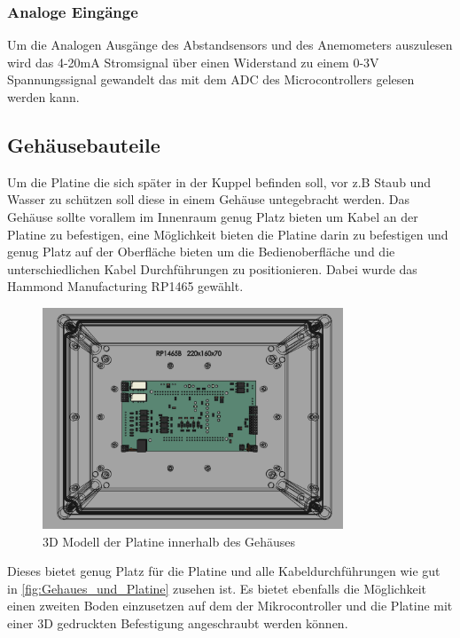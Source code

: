 \subsubsection{Analoge Eingänge}
Um die Analogen Ausgänge des Abstandsensors und des Anemometers auszulesen wird das 4-20mA Stromsignal über einen Widerstand zu einem 0-3V Spannungssignal gewandelt das mit dem \ac{ADC} des Microcontrollers gelesen werden kann.
\subsection{Gehäusebauteile}
Um die Platine die sich später in der Kuppel befinden soll, vor z.B Staub und Wasser zu schützen soll diese in einem Gehäuse untegebracht werden. Das Gehäuse sollte vorallem im Innenraum genug Platz bieten um Kabel an der Platine zu befestigen, eine Möglichkeit bieten die Platine darin zu befestigen und genug Platz auf der Oberfläche bieten um die Bedienoberfläche und die unterschiedlichen Kabel Durchführungen zu positionieren. Dabei wurde das Hammond Manufacturing RP1465 gewählt. 
\begin{figure}[H]
	\centering
	\includegraphics[width=0.8\textwidth]{images/Hardware/Platine_in_gehause.PNG}
	\caption{3D Modell der Platine innerhalb des Gehäuses}
	\label{fig:Gehaues_und_Platine}
\end{figure}
\noindent Dieses bietet genug Platz für die Platine und alle Kabeldurchführungen wie gut in \autoref{fig:Gehaues_und_Platine} zusehen ist. Es bietet ebenfalls die Möglichkeit einen zweiten Boden einzusetzen auf dem der Mikrocontroller und die Platine mit einer 3D gedruckten Befestigung angeschraubt werden können.\\

